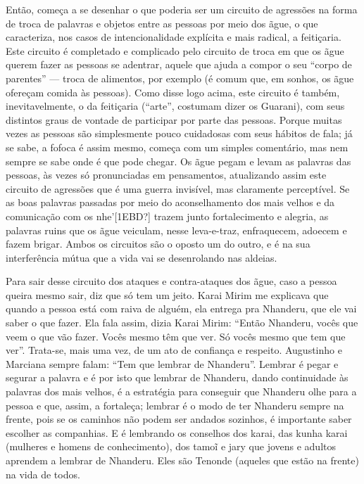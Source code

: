 \documentclass{article}
\begin{document}
Ent\~ao, come\c{c}a a se desenhar o que poderia ser um circuito de
agress\~oes na forma de troca de palavras e objetos entre as pessoas
por meio dos \~ague, o que caracteriza, nos casos de intencionalidade
expl\'icita e mais radical, a feiti\c{c}aria. Este circuito \'e
completado e complicado pelo circuito de troca em que os \~ague querem
fazer as pessoas se adentrar, aquele que ajuda a compor o seu
{\textquotedblleft}corpo de parentes{\textquotedblright} --- troca de
alimentos, por exemplo (\'e comum que, em sonhos, os \~ague
ofere\c{c}am comida \`as pessoas). Como disse logo acima, este circuito
\'e tamb\'em, inevitavelmente, o da feiti\c{c}aria
({\textquotedblleft}arte{\textquotedblright}, costumam dizer os
Guarani), com seus distintos graus de vontade de participar por parte
das pessoas. Porque muitas vezes as pessoas s\~ao simplesmente pouco
cuidadosas com seus h\'abitos de fala; j\'a se sabe, a fofoca \'e assim
mesmo, come\c{c}a com um simples coment\'ario, mas nem sempre se sabe
onde \'e que pode chegar.  Os \~ague pegam e levam as palavras das
pessoas, \`as vezes s\'o pronunciadas em pensamentos, atualizando assim
este circuito de agress\~oes que \'e uma guerra invis\'ivel, mas
claramente percept\'ivel. Se as boas palavras passadas por meio do
aconselhamento dos mais velhos e da comunica\c{c}\~ao com os
nhe{\textquoteright}[1EBD?] trazem junto fortalecimento e alegria, as
palavras ruins que os \~ague veiculam, nesse leva-e-traz, enfraquecem,
adoecem e fazem brigar. Ambos os circuitos s\~ao o oposto um do outro,
e \'e na sua interfer\^encia m\'utua que a vida vai se desenrolando nas
aldeias. 

Para sair desse circuito dos ataques e contra-ataques dos \~ague, caso a
pessoa queira mesmo sair, diz que s\'o tem um jeito. Karai Mirim me
explicava que quando a pessoa est\'a com raiva de algu\'em, ela entrega
pra Nhanderu, que ele vai saber o que fazer. Ela fala assim, dizia
Karai Mirim: {\textquotedblleft}Ent\~ao Nhanderu, voc\^es que veem o
que v\~ao fazer. Voc\^es mesmo t\^em que ver. S\'o voc\^es mesmo que
tem que ver{\textquotedblright}. Trata-se, mais uma vez, de um ato de
confian\c{c}a e respeito. Augustinho e Marciana sempre falam:
{\textquotedblleft}Tem que lembrar de Nhanderu{\textquotedblright}.
Lembrar \'e pegar e segurar a palavra e \'e por isto que lembrar de
Nhanderu, dando continuidade \`as palavras dos mais velhos, \'e a
estrat\'egia para conseguir que Nhanderu olhe para a pessoa e que,
assim, a fortale\c{c}a; lembrar \'e o modo de ter Nhanderu sempre na
frente, pois se os caminhos n\~ao podem ser andados sozinhos, \'e
importante saber escolher as companhias. E \'e lembrando os conselhos
dos karai, das kunha karai (mulheres e homens de conhecimento), dos
tamo\~{i} e jary que jovens e adultos aprendem a lembrar de Nhanderu.
Eles s\~ao Tenonde (aqueles que est\~ao na frente) na vida de todos.
\end{document}
